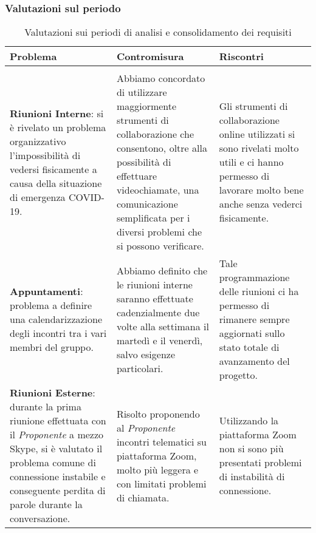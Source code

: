 		\subsubsection{Valutazioni sul periodo}
			\begin{longtable}{ 
				>{\centering}p{}
				>{\centering}p{}
				>{\centering\arraybackslash}p{}}
		
				\caption {Valutazioni sui periodi di analisi e consolidamento dei requisiti}		\\
		
				\textbf{\color{white}Problema} &
				\textbf{\color{white}Contromisura} &
				\textbf{\color{white}Riscontri}
				\tabularnewline  
				\endhead
		
				\multicolumn{3}{c}{Organizzazione} \\
				\textbf{Riunioni Interne}: si è rivelato un problema organizzativo l'impossibilità di vedersi fisicamente a causa della situazione di emergenza COVID-19\ped{\textit{G}}.
					&
				Abbiamo concordato di utilizzare maggiormente strumenti di collaborazione che consentono, oltre alla possibilità di effettuare videochiamate, una comunicazione semplificata per i diversi problemi che si possono verificare.
					&
				Gli strumenti di collaborazione online utilizzati si sono rivelati molto utili e ci hanno permesso di lavorare molto bene anche senza vederci fisicamente.
					\\
	
				\textbf{Appuntamenti}: problema a definire una calendarizzazione degli incontri tra i vari membri del gruppo.
					&
				Abbiamo definito che le riunioni interne saranno effettuate cadenzialmente due volte alla settimana il martedì e il venerdì, salvo esigenze particolari.
					&
				Tale programmazione delle riunioni ci ha permesso di rimanere sempre aggiornati sullo stato totale di avanzamento del progetto.
					\\
		
				\textbf{Riunioni Esterne}: durante la prima riunione effettuata con il \textit{Proponente}\ped{\textit{G}} a mezzo Skype\ped{\textit{G}}, si è valutato il problema comune di connessione instabile e conseguente perdita di parole durante la conversazione.
					&
				Risolto proponendo al \textit{Proponente}\ped{\textit{G}}	incontri telematici su piattaforma Zoom\ped{\textit{G}}, molto più leggera e con limitati problemi di chiamata.
					&
				Utilizzando la piattaforma Zoom\ped{\textit{G}} non si sono più presentati problemi di instabilità di connessione.
					\\
				

\end{longtable}
